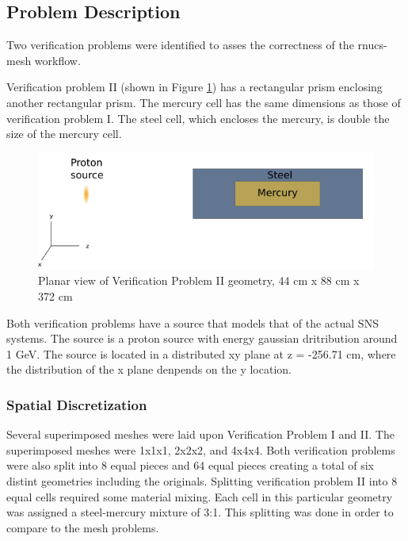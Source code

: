 \newpage
\subsection{Problem Description}
Two verification problems were identified to asses the correctness of the
rnucs-mesh workflow.

Verification problem II (shown in Figure \ref{TPII}) has a rectangular prism enclosing another rectangular
prism. 
The mercury cell has the same dimensions as those of verification problem I. The steel 
cell, which encloses the mercury, is double the size of the mercury cell. 
\begin{figure}[h!]
\begin{centering}
\includegraphics[width=0.70\linewidth]{../figs/mer_steel.png}
\caption{Planar view of Verification Problem II geometry, 44 cm x 88 cm x 372 cm }
\label{TPII}
\end{centering}
\end{figure}

Both verification problems have a source that models that of the
actual SNS systems. The source is a proton source with energy gaussian dritribution
around 1 GeV. The source is located in a distributed xy plane at z = -256.71 cm, 
where the distribution of the x plane denpends on the y location. 

\subsubsection{Spatial Discretization}
Several superimposed meshes were laid upon Verification Problem I and II. 
The superimposed meshes were 1x1x1, 2x2x2, and 4x4x4. Both verification problems
were also split into 8 equal pieces and 64 equal pieces creating a total of
six distint geometries including the originals. 
Splitting verification problem II into 8 equal cells required some material mixing. 
Each cell in this particular geometry was assigned a steel-mercury mixture
of 3:1. 
This splitting was done in order to compare to the mesh problems. 

